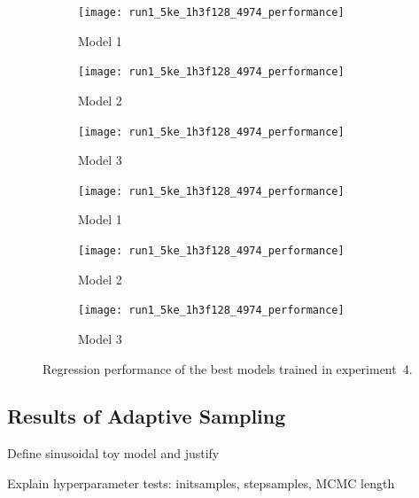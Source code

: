 \begin{figure}[h]
	\centering
	\begin{subfigure}[b]{0.333\textwidth}
		\centering
		\texttt{[image: run1\_5ke\_1h3f128\_4974\_performance]}
		\caption{Model 1}
	\end{subfigure}\hfill%
	\begin{subfigure}[b]{0.333\textwidth}
		\centering
		\texttt{[image: run1\_5ke\_1h3f128\_4974\_performance]}
		\caption{Model 2}
	\end{subfigure}\hfill%
	\begin{subfigure}[b]{0.333\textwidth}
		\centering
		\texttt{[image: run1\_5ke\_1h3f128\_4974\_performance]}
		\caption{Model 3}
	\end{subfigure}

	\vspace{0.75ex}

	\begin{subfigure}[b]{0.333\textwidth}
		\centering
		\texttt{[image: run1\_5ke\_1h3f128\_4974\_performance]}
		\caption{Model 1}
	\end{subfigure}\hfill%
	\begin{subfigure}[b]{0.333\textwidth}
		\centering
		\texttt{[image: run1\_5ke\_1h3f128\_4974\_performance]}
		\caption{Model 2}
	\end{subfigure}\hfill%
	\begin{subfigure}[b]{0.333\textwidth}
		\centering
		\texttt{[image: run1\_5ke\_1h3f128\_4974\_performance]}
		\caption{Model 3}
	\end{subfigure}
	\caption{Regression performance of the best models trained in experiment~4.}
	\label{fig:reg-performance}
\end{figure}

\subsection{Results of Adaptive Sampling}
\label{sec:adaptiveres}

Define sinusoidal toy model and justify

Explain hyperparameter tests: initsamples, stepsamples, MCMC length

